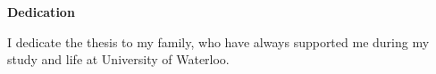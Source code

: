 \begin{center}\textbf{Dedication}\end{center}

I dedicate the thesis to my family, who have always supported me during my study and life at University of Waterloo.
\cleardoublepage

\renewcommand\contentsname{Table of Contents}
\tableofcontents
\cleardoublepage
{}    %

\listoffigures
\cleardoublepage
{}		%

\listoftables
\cleardoublepage
{}		%


